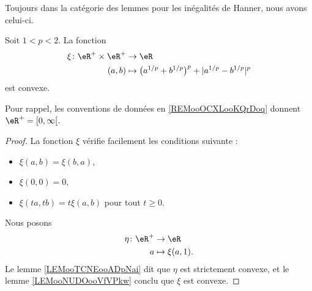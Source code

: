 Toujours dans la catégorie des lemmes pour les inégalités de Hanner, nous avons celui-ci.
\begin{lemma}
    Soit \( 1<p<2\). La fonction
    \begin{equation}
        \begin{aligned}
            \xi\colon \eR^+\times \eR^+ & \to \eR                                                     \\
            (a,b)                       & \mapsto \big( a^{1/p}+b^{1/p} \big)^p+| a^{1/p}-b^{1/p} |^p
        \end{aligned}
    \end{equation}
    est convexe.

    Pour rappel, les conventions de données en \ref{REMooOCXLooKQrDoq} donnent \( \eR^+=\mathopen[ 0 , \infty \mathclose[\).
\end{lemma}

\begin{proof}
    La fonction \( \xi\) vérifie facilement les conditions suivante :
    \begin{itemize}
        \item \( \xi(a,b)=\xi(b,a)\),
        \item \( \xi(0,0)=0\),
        \item \( \xi(ta,tb)=t\xi(a,b)\) pour tout \( t\geq 0\).
    \end{itemize}
    Nous posons
    \begin{equation}
        \begin{aligned}
            \eta\colon \eR^+ & \to \eR           \\
            a                & \mapsto \xi(a,1).
        \end{aligned}
    \end{equation}
    Le lemme \ref{LEMooTCNEooADpNai} dit que \( \eta\) est strictement convexe, et le lemme \ref{LEMooNUDOooVfVPkw} conclu que \( \xi\) est convexe.
\end{proof}

